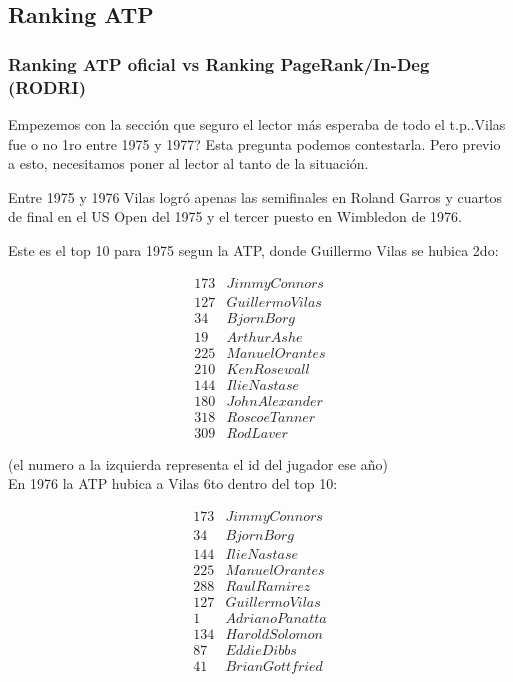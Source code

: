 \subsection{Ranking ATP}

\subsubsection{Ranking ATP oficial vs Ranking PageRank/In-Deg (RODRI)}

Empezemos con la sección que seguro el lector más esperaba de todo el t.p..Vilas fue o no 1ro entre 1975 y 1977? Esta pregunta podemos contestarla. Pero previo a esto, necesitamos poner al lector al tanto de la situación.


Entre 1975 y 1976 Vilas logró apenas las semifinales en Roland Garros y cuartos de final en el US Open del 1975 y el tercer puesto en Wimbledon de 1976.


Este es el top 10 para 1975 segun la ATP, donde Guillermo Vilas se hubica 2do:

\begin{eqnarray*}
173 & Jimmy Connors \\
127 & Guillermo Vilas \\
34 & Bjorn Borg \\
19 & Arthur Ashe \\
225 & Manuel Orantes \\
210 & Ken Rosewall \\
144 & Ilie Nastase \\
180 & John Alexander \\
318 & Roscoe Tanner \\
309 & Rod Laver 
\end{eqnarray*}

(el numero a la izquierda representa el id del jugador ese año)\\


En 1976 la ATP hubica a Vilas 6to dentro del top 10:

\begin{eqnarray*}
173 & Jimmy Connors \\
34 & Bjorn Borg \\
144 & Ilie Nastase \\
225 & Manuel Orantes \\
288 & Raul Ramirez \\
127 & Guillermo Vilas \\
1 & Adriano Panatta \\
134 & Harold Solomon \\
87 & Eddie Dibbs \\
41 & Brian Gottfried 
\end{eqnarray*}

